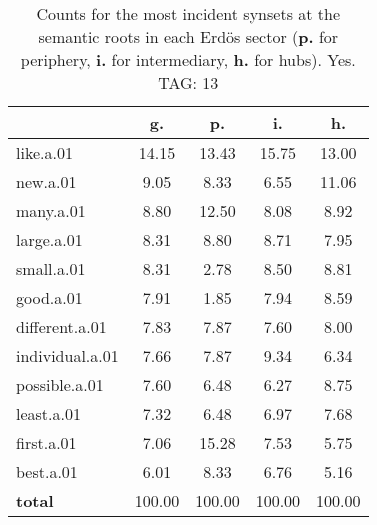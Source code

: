 \begin{table}[h!]
\begin{center}
\begin{tabular}{| l | c | c | c | c |}\hline
 & g. & p. & i. & h. \\\hline
like.a.01 & 14.15  & 13.43  & 15.75  & 13.00 \\\hline
new.a.01 & 9.05  & 8.33  & 6.55  & 11.06 \\\hline
many.a.01 & 8.80  & 12.50  & 8.08  & 8.92 \\\hline
large.a.01 & 8.31  & 8.80  & 8.71  & 7.95 \\\hline
small.a.01 & 8.31  & 2.78  & 8.50  & 8.81 \\\hline
good.a.01 & 7.91  & 1.85  & 7.94  & 8.59 \\\hline
different.a.01 & 7.83  & 7.87  & 7.60  & 8.00 \\\hline
individual.a.01 & 7.66  & 7.87  & 9.34  & 6.34 \\\hline
possible.a.01 & 7.60  & 6.48  & 6.27  & 8.75 \\\hline
least.a.01 & 7.32  & 6.48  & 6.97  & 7.68 \\\hline
first.a.01 & 7.06  & 15.28  & 7.53  & 5.75 \\\hline
best.a.01 & 6.01  & 8.33  & 6.76  & 5.16 \\\hline
{{\bf total}} & 100.00  & 100.00  & 100.00  & 100.00 \\\hline
\end{tabular}
\caption{Counts for the most incident synsets at the semantic roots in each Erd\"os sector ({\bf p.} for periphery, {\bf i.} for intermediary, {\bf h.} for hubs). Yes. TAG: 13}
\end{center}
\end{table}